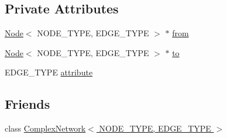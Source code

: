 \subsection*{Private Attributes}
\begin{DoxyCompactItemize}
\item 
\hyperlink{class_node}{Node}$<$ N\+O\+D\+E\+\_\+\+T\+Y\+P\+E, E\+D\+G\+E\+\_\+\+T\+Y\+P\+E $>$ $\ast$ \hyperlink{class_edge_a1bffa41df2941b7d55c59a5031f78e14}{from}
\item 
\hyperlink{class_node}{Node}$<$ N\+O\+D\+E\+\_\+\+T\+Y\+P\+E, E\+D\+G\+E\+\_\+\+T\+Y\+P\+E $>$ $\ast$ \hyperlink{class_edge_a7ba6dee1554e4a0a7cf69862e90fdd85}{to}
\item 
E\+D\+G\+E\+\_\+\+T\+Y\+P\+E \hyperlink{class_edge_ae49cc056dfa848b0a1beef821d81a31d}{attribute}
\end{DoxyCompactItemize}
\subsection*{Friends}
\begin{DoxyCompactItemize}
\item 
class \hyperlink{class_edge_ad8438fc5199b628ea294f77319026b6a}{Complex\+Network$<$ N\+O\+D\+E\+\_\+\+T\+Y\+P\+E, E\+D\+G\+E\+\_\+\+T\+Y\+P\+E $>$}
\end{DoxyCompactItemize}


